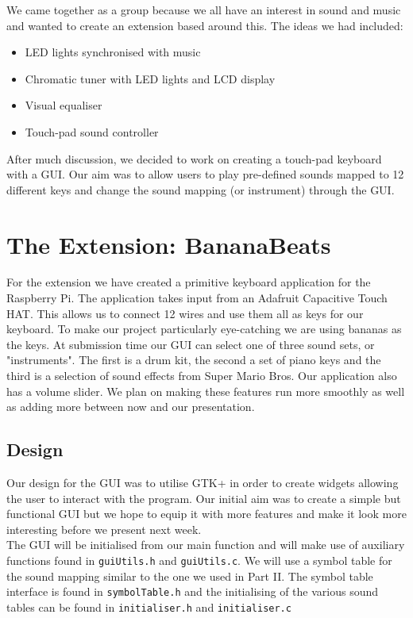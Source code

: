 \documentclass[11pt]{article}
\begin{document}
We came together as a group because we all have an interest in sound and music and wanted to create an extension based around this. The ideas we had included:
\begin{itemize}
\item LED lights synchronised with music
\item Chromatic tuner with LED lights and LCD display
\item Visual equaliser 
\item Touch-pad sound controller 
\end{itemize}
After much discussion, we decided to work on creating a touch-pad keyboard with a GUI. Our aim was to allow users to play pre-defined sounds mapped to 12 different keys and change the sound mapping (or instrument) through the GUI.

\section{The Extension: BananaBeats}
	For the extension we have created a primitive keyboard application for the Raspberry Pi. The application takes input from an Adafruit Capacitive Touch HAT. This allows us to connect 12 wires and use them all as keys for our keyboard. To make our project particularly eye-catching we are using bananas as the keys. At submission time our GUI can select one of three sound sets, or "instruments". The first is a drum kit, the second a set of piano keys and the third is a selection of sound effects from Super Mario Bros. Our application also has a volume slider. We plan on making these features run more smoothly as well as adding more between now and our presentation.

\subsection{Design}
	Our design for the GUI was to utilise GTK+ in order to create widgets allowing the user to interact with the program. Our initial aim was to create a simple but functional GUI but we hope to equip it with more features and make it look more interesting before we present next week. 
	\\
	
	The GUI will be initialised from our main function and will make use of auxiliary functions found in \texttt{guiUtils.h} and \texttt{guiUtils.c}. We will use a symbol table for the sound mapping similar to the one we used in Part II. The symbol table interface is found in \texttt{symbolTable.h} and the initialising of the various sound tables can be found in \texttt{initialiser.h} and \texttt{initialiser.c}
\end{document}
